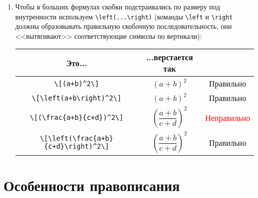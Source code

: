\documentclass[12pt,a4paper]{book}
\newcommand{\ok}{& \textcolor{green!60!black}{Правильно}}
\newcommand{\bad}{& \textcolor{red}{Неправильно}}
\begin{document}
\begin{enumerate}
\item
	Чтобы в больших формулах скобки подстраивались по размеру под внутренности
	используем \verb'\left(...\right)'
	(команды \verb'\left' и \verb'\right' должны образовывать правильную скобочную последовательность,
	они <<вытягивают>> соответствующие символы по вертикали):
	\begin{center}\begin{tabular}{|c|c|c|}
		\hline Это... & ...верстается так & \\
		\hline \verb'\[(a+b)^2\]'                        & \begin{minipage}{3cm}\[(a+b)^2\]\end{minipage} \ok \\
		\hline \verb'\[\left(a+b\right)^2\]'             & \begin{minipage}{3cm}\[\left(a+b\right)^2\]\end{minipage} \ok \\
		\hline \verb'\[(\frac{a+b}{c+d})^2\]'            & \begin{minipage}{3cm}\[(\frac{a+b}{c+d})^2\]\end{minipage} \bad \\
		\hline \verb'\[\left(\frac{a+b}{c+d}\right)^2\]' & \begin{minipage}{3cm}\[\left(\frac{a+b}{c+d}\right)^2\]\end{minipage} \ok \\
		\hline
	\end{tabular}\end{center}
\end{enumerate}

\section{Особенности правописания}
\end{document}
